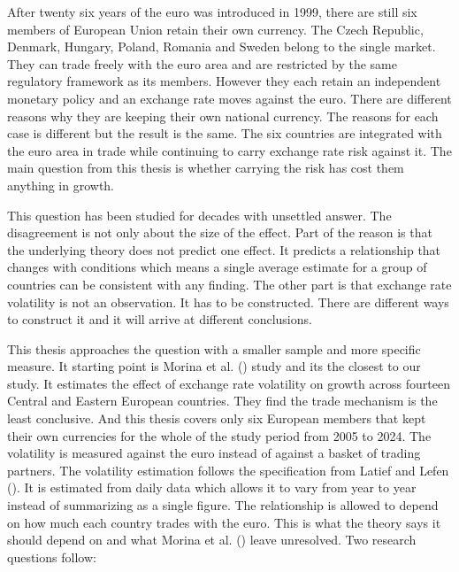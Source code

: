 \label{sec:intro}



After twenty six years of the euro was introduced in 1999, there are still six members of European Union retain their own currency.
The Czech Republic, Denmark, Hungary, Poland, Romania and Sweden belong to the single market.
They can trade freely with the euro area and are restricted by the same regulatory framework as its members.
However they each retain an independent monetary policy and an exchange rate moves against the euro.
There are different reasons why they are keeping their own national currency.
The reasons for each case is different but the result is the same.
The six countries are integrated with the euro area in trade while continuing to carry exchange rate risk against it.
The main question from this thesis is whether carrying the risk has cost them anything in growth.

\vspace{\baselineskip}

This question has been studied for decades with unsettled answer.
The disagreement is not only about the size of the effect.
Part of the reason is that the underlying theory does not predict one effect.
It predicts a relationship that changes with conditions which means a single average estimate for a group of countries can be consistent with any finding.
The other part is that exchange rate volatility is not an observation.
It has to be constructed.
There are different ways to construct it and it will arrive at different conclusions.

\vspace{\baselineskip}

This thesis approaches the question with a smaller sample and more specific measure.
It starting point is Morina et al. (\citeyear{morina_effect_2020}) study and its the closest to our study.
It estimates the effect of exchange rate volatility on growth across fourteen Central and Eastern European countries.
They find the trade mechanism is the least conclusive.
And this thesis covers only six European members that kept their own currencies for the whole of the study period from 2005 to 2024.
The volatility is measured against the euro instead of against a basket of trading partners.
The volatility estimation follows the specification from Latief and Lefen (\citeyear{latief_effect_2018}).
It is estimated from daily data which allows it to vary from year to year instead of summarizing as a single figure.
The relationship is allowed to depend on how much each country trades with the euro.
This is what the theory says it should depend on and what Morina et al. (\citeyear{morina_effect_2020}) leave unresolved.
Two research questions follow:
\vspace{\baselineskip}

